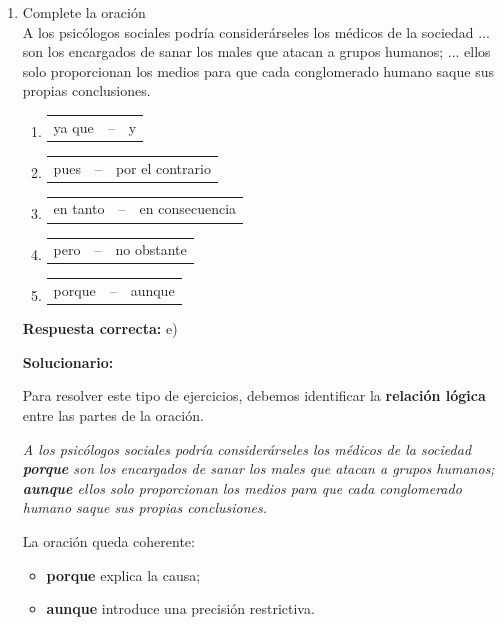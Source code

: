 \begin{enumerate}[resume]
	\vspace{6mm}
	
	\item Complete la oración\\
	A los psicólogos sociales podría considerárseles los médicos de la sociedad ... son los encargados de sanar los males que atacan a grupos humanos; ... ellos solo proporcionan los medios para que cada conglomerado humano saque sus propias conclusiones. 
	
	\begin{enumerate}[label=\alph*)]
		\item \begin{tabular}{p{2.5cm} cp{3cm}} ya que & -- & y \end{tabular}
		\item \begin{tabular}{p{2.5cm} cp{3cm}} pues & -- & por el contrario \end{tabular}
		\item \begin{tabular}{p{2.5cm} cp{3cm}} en tanto & -- & en consecuencia \end{tabular}
		\item \begin{tabular}{p{2.5cm} cp{3cm}} pero & -- & no obstante \end{tabular}
		\item \begin{tabular}{p{2.5cm} cp{3cm}} porque & -- & aunque \end{tabular}
	\end{enumerate}
	
	\textbf{Respuesta correcta:} e)
	
	\vspace{2mm}
	\textbf{Solucionario:}
	
	Para resolver este tipo de ejercicios, debemos identificar la \textbf{relación lógica} entre las partes de la oración.
	
	\textit{A los psicólogos sociales podría considerárseles los médicos de la sociedad \textbf{porque} son los encargados de sanar los males que atacan a grupos humanos; \textbf{aunque} ellos solo proporcionan los medios para que cada conglomerado humano saque sus propias conclusiones.}
	
	La oración queda coherente:
	
	\begin{itemize}[label=--]
		\item \textbf{porque} explica la causa;
		\item \textbf{aunque} introduce una precisión restrictiva.
	\end{itemize}
	

\end{enumerate}
